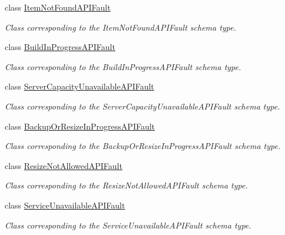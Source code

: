 \begin{DoxyCompactItemize}
class \hyperlink{classopenstack_1_1xml_1_1ItemNotFoundAPIFault}{ItemNotFoundAPIFault}
\begin{DoxyCompactList}\small\item\em Class corresponding to the ItemNotFoundAPIFault schema type. \item\end{DoxyCompactList}\item 
class \hyperlink{classopenstack_1_1xml_1_1BuildInProgressAPIFault}{BuildInProgressAPIFault}
\begin{DoxyCompactList}\small\item\em Class corresponding to the BuildInProgressAPIFault schema type. \item\end{DoxyCompactList}\item 
class \hyperlink{classopenstack_1_1xml_1_1ServerCapacityUnavailableAPIFault}{ServerCapacityUnavailableAPIFault}
\begin{DoxyCompactList}\small\item\em Class corresponding to the ServerCapacityUnavailableAPIFault schema type. \item\end{DoxyCompactList}\item 
class \hyperlink{classopenstack_1_1xml_1_1BackupOrResizeInProgressAPIFault}{BackupOrResizeInProgressAPIFault}
\begin{DoxyCompactList}\small\item\em Class corresponding to the BackupOrResizeInProgressAPIFault schema type. \item\end{DoxyCompactList}\item 
class \hyperlink{classopenstack_1_1xml_1_1ResizeNotAllowedAPIFault}{ResizeNotAllowedAPIFault}
\begin{DoxyCompactList}\small\item\em Class corresponding to the ResizeNotAllowedAPIFault schema type. \item\end{DoxyCompactList}\item 
class \hyperlink{classopenstack_1_1xml_1_1ServiceUnavailableAPIFault}{ServiceUnavailableAPIFault}
\begin{DoxyCompactList}\small\item\em Class corresponding to the ServiceUnavailableAPIFault schema type. \item\end{DoxyCompactList}\item 

\end{DoxyCompactItemize}
